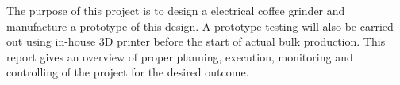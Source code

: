 \noindent The purpose of this project is to design a electrical coffee grinder and manufacture a prototype of
this design.  A prototype testing will also be carried out using in-house 3D printer before the start of actual bulk production. This report gives an overview of proper planning, execution, monitoring and controlling of the project for the desired outcome.
